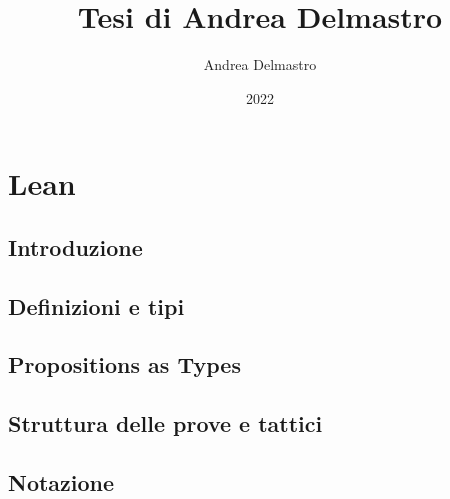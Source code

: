 \documentclass[oneside, openany, 12pt, a4paper]{memoir}
\title{Tesi di Andrea Delmastro}
\author{Andrea Delmastro}
\date{2022}
\begin{document}
\frontmatter

\maketitle

\newpage


\newpage 
{
  \hypersetup{linkcolor=black}
  \tableofcontents
}

\mainmatter

\part{Lean}

\chapter{Introduzione}


\chapter{Definizioni e tipi}


\chapter{Propositions as Types}


\chapter{Struttura delle prove e tattici}


\appendix
\chapter{Notazione}


\backmatter
\medskip
\nocite{*}
\printbibliography
\end{document}
